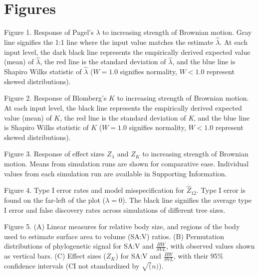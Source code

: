 \documentclass[
]{article}
\begin{document}
\newpage

\hypertarget{figures}{%
\section{Figures}\label{figures}}

Figure 1. Response of Pagel's \(\lambda\) to increasing strength of
Brownian motion. Gray line signifies the 1:1 line where the input value
matches the estimate \(\hat\lambda\). At each input level, the dark
black line represents the empirically derived expected value (mean) of
\(\hat\lambda\), the red line is the standard deviation of
\(\hat\lambda\), and the blue line is Shapiro Wilks statistic of
\(\hat\lambda\) (\(W=1.0\) signifies normality, \(W< 1.0\) represent
skewed distributions). \hfill\break

Figure 2. Response of Blomberg's \(K\) to increasing strength of
Brownian motion. At each input level, the black line represents the
empirically derived expected value (mean) of \(K\), the red line is the
standard deviation of \emph{K}, and the blue line is Shapiro Wilks
statistic of \(K\) (\(W=1.0\) signifies normality, \(W< 1.0\) represent
skewed distributions). \hfill\break

Figure 3. Response of effect sizes \(Z_\lambda\) and \(Z_K\) to
increasing strength of Brownian motion. Means from simulation runs are
shown for comparative ease. Individual values from each simulation run
are available in Supporting Information. \hfill\break

Figure 4. Type I error rates and model misspecification for
\(\hat{Z}_{12}\). Type I error is found on the far-left of the plot
(\(\lambda = 0\)). The black line signifies the average type I error and
false discovery rates across simulations of different tree sizes.

Figure 5. (A) Linear measures for relative body size, and regions of the
body used to estimate surface area to volume (SA:V) ratios. (B)
Permutation distributions of phylogenetic signal for SA:V and
\(\frac{BW}{SVL}\), with observed values shown as vertical bars. (C)
Effect sizes (\(Z_K\)) for SA:V and \(\frac{BW}{SVL}\), with their 95\%
confidence intervals (CI not standardized by \(\sqrt(n)\)). \hfill\break

\newpage
\end{document}
